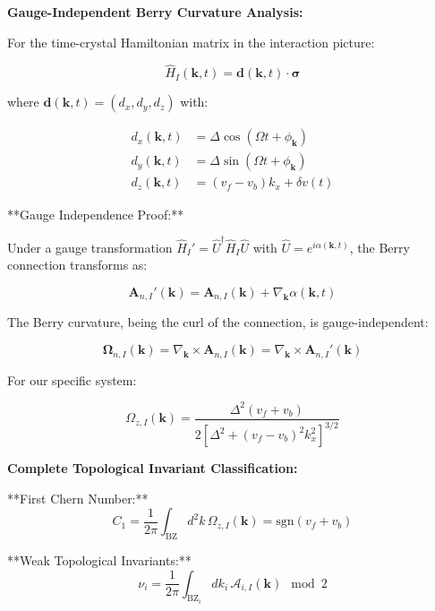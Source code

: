 \documentclass[11pt]{article}
\begin{document}
\textbf{Gauge-Independent Berry Curvature Analysis:}

For the time-crystal Hamiltonian matrix in the interaction picture:

\begin{equation}
\hat{H}_I(\mathbf{k}, t) = \mathbf{d}(\mathbf{k}, t) \cdot \boldsymbol{\sigma}
\end{equation}

where $\mathbf{d}(\mathbf{k}, t) = (d_x, d_y, d_z)$ with:

\begin{align}
d_x(\mathbf{k}, t) &= \Delta \cos(\Omega t + \phi_{\mathbf{k}}) \\
d_y(\mathbf{k}, t) &= \Delta \sin(\Omega t + \phi_{\mathbf{k}}) \\
d_z(\mathbf{k}, t) &= (v_f - v_b) k_x + \delta v(t)
\end{align}

**Gauge Independence Proof:**

Under a gauge transformation $\hat{H}_I' = \hat{U}^\dagger \hat{H}_I \hat{U}$ with $\hat{U} = e^{i\alpha(\mathbf{k},t)}$, the Berry connection transforms as:

\begin{equation}
\mathbf{A}_{n,I}'(\mathbf{k}) = \mathbf{A}_{n,I}(\mathbf{k}) + \nabla_{\mathbf{k}} \alpha(\mathbf{k},t)
\end{equation}

The Berry curvature, being the curl of the connection, is gauge-independent:

\begin{equation}
\boldsymbol{\Omega}_{n,I}(\mathbf{k}) = \nabla_{\mathbf{k}} \times \mathbf{A}_{n,I}(\mathbf{k}) = \nabla_{\mathbf{k}} \times \mathbf{A}_{n,I}'(\mathbf{k})
\end{equation}

For our specific system:

\begin{equation}
\Omega_{z,I}(\mathbf{k}) = \frac{\Delta^2 (v_f + v_b)}{2[\Delta^2 + (v_f - v_b)^2 k_x^2]^{3/2}}
\end{equation}

\textbf{Complete Topological Invariant Classification:}

**First Chern Number:**
\begin{equation}
C_1 = \frac{1}{2\pi} \int_{\text{BZ}} d^2k \, \Omega_{z,I}(\mathbf{k}) = \text{sgn}(v_f + v_b)
\end{equation}

**Weak Topological Invariants:**
\begin{equation}
\nu_i = \frac{1}{2\pi} \int_{\text{BZ}_i} dk_i \, \mathcal{A}_{i,I}(\mathbf{k}) \mod 2
\end{equation}
\end{document}
